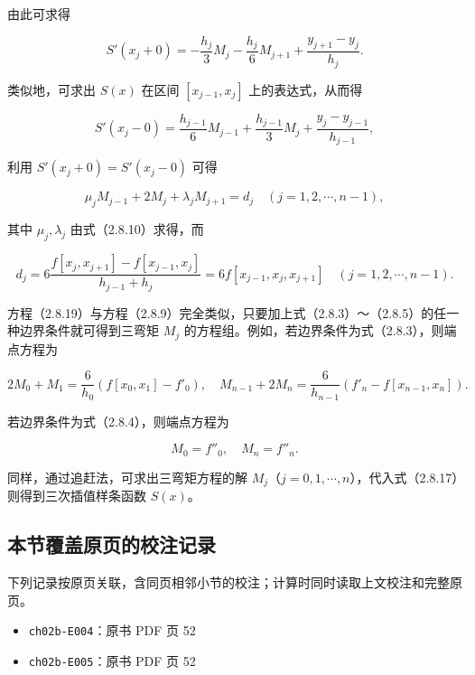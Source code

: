 \documentclass[
  10pt,
  fontset=fandol]{ctexart}
\providecommand{\tightlist}{%
  \setlength{\itemsep}{0pt}\setlength{\parskip}{0pt}}
\begin{document}
由此可求得

\[S'(x_j+0)=-\frac{h_j}3M_j-\frac{h_j}6M_{j+1}+\frac{y_{j+1}-y_j}{h_j}.\]

类似地，可求出 \(S(x)\) 在区间 \([x_{j-1},x_j]\) 上的表达式，从而得

\[S'(x_j-0)=\frac{h_{j-1}}6M_{j-1}+\frac{h_{j-1}}3M_j+\frac{y_j-y_{j-1}}{h_{j-1}},\]

利用 \(S'(x_j+0)=S'(x_j-0)\) 可得

\[\mu_jM_{j-1}+2M_j+\lambda_jM_{j+1}=d_j\quad(j=1,2,\cdots,n-1),\tag{2.8.19}\]

其中 \(\mu_j,\lambda_j\) 由式（2.8.10）求得，而

\[d_j=6\frac{f[x_j,x_{j+1}]-f[x_{j-1},x_j]}{h_{j-1}+h_j}=6f[x_{j-1},x_j,x_{j+1}]\quad(j=1,2,\cdots,n-1).\tag{2.8.20}\]

方程（2.8.19）与方程（2.8.9）完全类似，只要加上式（2.8.3）～（2.8.5）的任一种边界条件就可得到三弯矩 \(M_j\) 的方程组。例如，若边界条件为式（2.8.3），则端点方程为

\[2M_0+M_1=\frac6{h_0}(f[x_0,x_1]-f'_0),\quad M_{n-1}+2M_n=\frac6{h_{n-1}}(f'_n-f[x_{n-1},x_n]).\]

若边界条件为式（2.8.4），则端点方程为

\[M_0=f''_0,\quad M_n=f''_n.\]

同样，通过追赶法，可求出三弯矩方程的解 \(M_j\)（\(j=0,1,\cdots,n\)），代入式（2.8.17）则得到三次插值样条函数 \(S(x)\)。

\subsection{本节覆盖原页的校注记录}\label{ux672cux8282ux8986ux76d6ux539fux9875ux7684ux6821ux6ce8ux8bb0ux5f55}

下列记录按原页关联，含同页相邻小节的校注；计算时同时读取上文校注和完整原页。

\begin{itemize}
\tightlist
\item
  \texttt{ch02b-E004}：原书 PDF 页 52
\item
  \texttt{ch02b-E005}：原书 PDF 页 52
\end{itemize}
\end{document}
